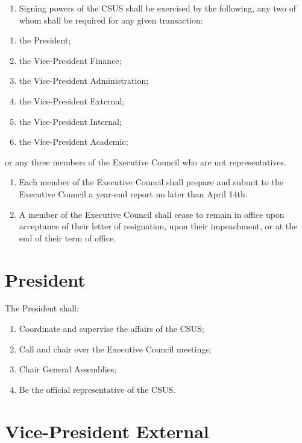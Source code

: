 \begin{enumerate}
\def\labelenumi{\arabic{enumi}.}
\setcounter{enumi}{1}
\tightlist
\item
  Signing powers of the CSUS shall be exercised by the following, any
  two of whom shall be required for any given transaction:
\end{enumerate}

\begin{enumerate}
\def\labelenumi{(\alph{enumi})}
\tightlist
\item
  the President;
\item
  the Vice-President Finance;
\item
  the Vice-President Administration;
\item
  the Vice-President External;
\item
  the Vice-President Internal;
\item
  the Vice-President Academic;
\end{enumerate}
  or any three members of the Executive
  Council who are not representatives.

\begin{enumerate}
\def\labelenumi{\arabic{enumi}.}
\setcounter{enumi}{2}
\item
  Each member of the Executive Council shall prepare and submit to the
  Executive Council a year-end report no later than April 14th.
\item
  A member of the Executive Council shall cease to remain in office upon
  acceptance of their letter of resignation, upon their impeachment, or at the end of their term of office.
\end{enumerate}

\section{President}\label{president}

The President shall:

\begin{enumerate}
\def\labelenumi{\arabic{enumi}.}
\item
  Coordinate and supervise the affairs of the CSUS;
\item
  Call and chair over the Executive Council meetings;
\item
  Chair General Assemblies;
\item
  Be the official representative of the CSUS.
\end{enumerate}

\section{Vice-President
External}\label{vice-president-external}

